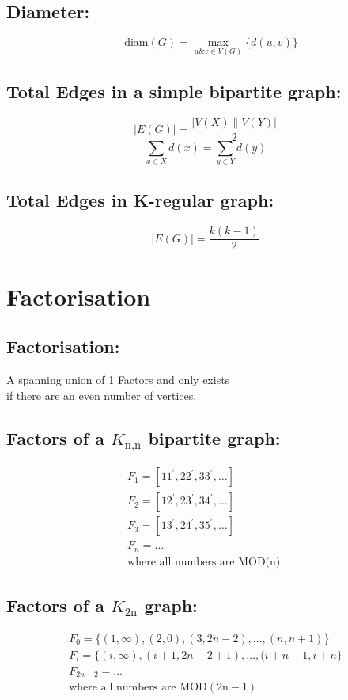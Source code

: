 \documentclass[../../mathematics_cheat_sheet.tex]{subfiles}
\begin{document}
\subsection{Diameter:}
\[\quad \text{diam}(G)=\max _{u \& v \in V(G)}\{d(u, v)\}\]
%
\subsection{Total Edges in a simple bipartite graph:}
\[|E(G)|=\frac{|V(X) \| V(Y)|}{2} \]
\[\sum_{x \in X} d(x)=\sum_{y \in Y} d(y)\]
%
\subsection{Total Edges in K-regular graph:}
\[|E(G)|=\frac{k(k-1)}{2}\]
%
\section{Factorisation}
%
\subsection{Factorisation:}
\begin{center}
  A spanning union of 1 Factors and only exists\\ if there are an even number of vertices.
\end{center}
%
\subsection{Factors of a $K_\text{n,n}$ bipartite graph:}
\[
  \begin{array}{l}
    F_{1}=\left[11^{\prime}, 22^{\prime}, 33^{\prime}, \ldots\right]\\
    F_{2}=\left[12^{\prime}, 23^{\prime}, 34^{\prime}, \ldots\right]\\
    F_{3}=\left[13^{\prime}, 24^{\prime}, 35^{\prime}, \ldots\right]\\
    F_{n}=\ldots\\
    \text{where all numbers are MOD(n) }
  \end{array}
\]
%
\subsection{Factors of a $K_\text{2n}$ graph:}
\[
  \begin{array}{l}
    F_{0}=\{(1, \infty),(2,0),(3,2 n-2), \ldots,(n, n+1)\}\\
    F_{i}=\{(i, \infty),(i+1,2 n-2+1), \ldots,(i+n-1, i+n\}\\
    F_{2 n-2}=\ldots\\
    \text{where all numbers are } \mathrm{MOD}(2 \mathrm{n}-1)
  \end{array}
\]
%
%
\end{document}
